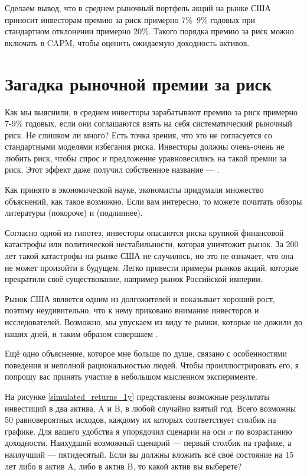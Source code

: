 Сделаем вывод, что в среднем рыночный портфель акций на рынке США приносит инвесторам премию за риск примерно 7\%--9\% годовых при стандартном отклонении примерно 20\%. Такого порядка премию за риск можно включать в CAPM, чтобы оценить ожидаемую доходность активов.

\section{Загадка рыночной премии за риск}

Как мы выяснили, в среднем инвесторы зарабатывают премию за риск примерно 7-9\%  годовых, если они соглашаются взять на себя систематический рыночный риск. Не слишком ли много? Есть точка зрения, что это не согласуется со стандартными моделями избегания риска. Инвесторы должны очень-очень не любить риск, чтобы спрос и предложение уравновесились на такой премии за риск. Этот эффект даже получил собственное название --- .

Как принято в экономической науке, экономисты придумали множество объяснений, как такое возможно. Если вам интересно, то можете почитать обзоры литературы \cite{siegel1997anomalies} (покороче) и \cite{mehra2007equity} (подлиннее).

Согласно одной из гипотез, инвесторы опасаются риска крупной финансовой катастрофы или политической нестабильности, которая уничтожит рынок. За 200 лет такой катастрофы на рынке США не случилось, но это не означает, что она не может произойти в будущем. Легко привести примеры рынков акций, которые прекратили своё существование, например рынок Российской империи.

Рынок США является одним из долгожителей и показывает хороший рост, поэтому неудивительно, что к нему приковано внимание инвесторов и исследователей. Возможно, мы упускаем из виду те рынки, которые не дожили до наших дней, и таким образом совершаем .

Ещё одно объяснение, которое мне больше по душе, связано с особенностями поведения и неполной рациональностью людей. Чтобы проиллюстрировать его, я попрошу вас принять участие в небольшом мысленном эксперименте.

На рисунке \ref{simulated_returns_1y} представлены возможные результаты
инвестиций в два актива, A и B, в любой случайно взятый год. Всего возможны 50
равновероятных исходов, каждому их которых соответствует столбик на графике. Для
вашего удобства я упорядочил сценарии на оси $x$ по возрастанию доходности.
Наихудший возможный сценарий --- первый столбик на графике, а наилучший ---
пятидесятый. Если вы должны вложить всё своё состояние на 15 лет либо в актив A,
либо в актив B, то какой актив вы выберете?

